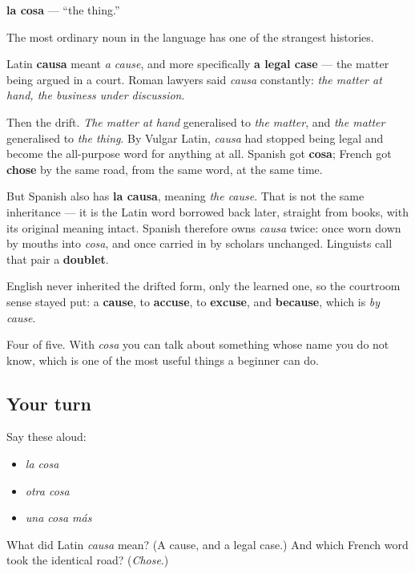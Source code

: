 \begin{cousinweb}
\textbf{la cosa} — \textquotedblleft{}the thing.\textquotedblright{}

The most ordinary noun in the language has one of the strangest histories.

Latin \textbf{causa} meant \emph{a cause}, and more specifically \textbf{a legal case} — the matter being argued in a court. Roman lawyers said \emph{causa} constantly: \emph{the matter at hand, the business under discussion}.

Then the drift. \emph{The matter at hand} generalised to \emph{the matter}, and \emph{the matter} generalised to \emph{the thing}. By Vulgar Latin, \emph{causa} had stopped being legal and become the all-purpose word for anything at all. Spanish got \textbf{cosa}; French got \textbf{chose} by the same road, from the same word, at the same time.

But Spanish also has \textbf{la causa}, meaning \emph{the cause}. That is not the same inheritance — it is the Latin word borrowed back later, straight from books, with its original meaning intact. Spanish therefore owns \emph{causa} twice: once worn down by mouths into \emph{cosa}, and once carried in by scholars unchanged. Linguists call that pair a \textbf{doublet}.

English never inherited the drifted form, only the learned one, so the courtroom sense stayed put: a \textbf{cause}, to \textbf{accuse}, to \textbf{excuse}, and \textbf{because}, which is \emph{by cause}.
\end{cousinweb}

\begin{grammarlens}[title={What you've built}]
Four of five. With \emph{cosa} you can talk about something whose name you do not know, which is one of the most useful things a beginner can do.
\end{grammarlens}

\subsection*{Your turn}
Say these aloud:

\begin{itemize}
\raggedright
  \item \emph{la cosa}
  \item \emph{otra cosa}
  \item \emph{una cosa más}
\end{itemize}

\begin{tcolorbox}[breakable,colback=teal!4,colframe=teal!35!black,title={Before you move on}]
What did Latin \emph{causa} mean? (A cause, and a legal case.) And which French word took the identical road? (\emph{Chose}.)
\end{tcolorbox}
